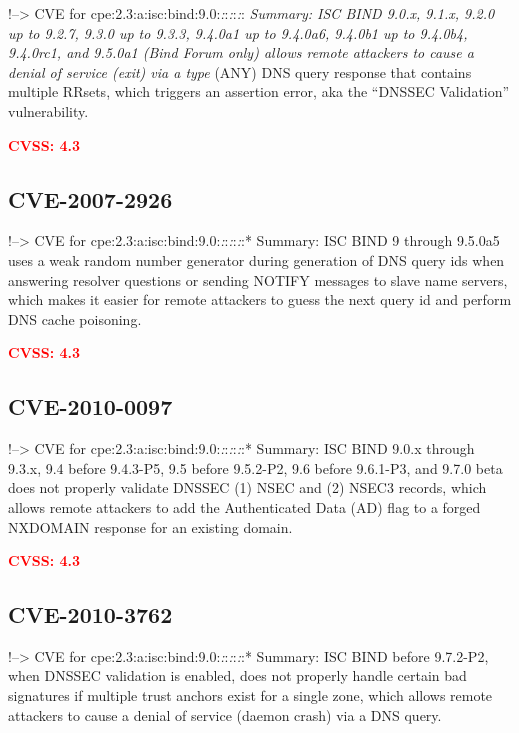 \documentclass[a4paper, 12pt]{article}
\begin{document}
!--\textgreater{} CVE for
cpe:2.3:a:isc:bind:9.0:\emph{:}:\emph{:}:\emph{:}:\emph{ Summary: ISC
BIND 9.0.x, 9.1.x, 9.2.0 up to 9.2.7, 9.3.0 up to 9.3.3, 9.4.0a1 up to
9.4.0a6, 9.4.0b1 up to 9.4.0b4, 9.4.0rc1, and 9.5.0a1 (Bind Forum only)
allows remote attackers to cause a denial of service (exit) via a type }
(ANY) DNS query response that contains multiple RRsets, which triggers
an assertion error, aka the ``DNSSEC Validation'' vulnerability.

\textbf{\textcolor{red}{CVSS: 4.3}}

\hypertarget{cve-2007-2926}{%
\subsection{CVE-2007-2926}\label{cve-2007-2926}}

!--\textgreater{} CVE for
cpe:2.3:a:isc:bind:9.0:\emph{:}:\emph{:}:\emph{:}:* Summary: ISC BIND 9
through 9.5.0a5 uses a weak random number generator during generation of
DNS query ids when answering resolver questions or sending NOTIFY
messages to slave name servers, which makes it easier for remote
attackers to guess the next query id and perform DNS cache poisoning.

\textbf{\textcolor{red}{CVSS: 4.3}}

\hypertarget{cve-2010-0097}{%
\subsection{CVE-2010-0097}\label{cve-2010-0097}}

!--\textgreater{} CVE for
cpe:2.3:a:isc:bind:9.0:\emph{:}:\emph{:}:\emph{:}:* Summary: ISC BIND
9.0.x through 9.3.x, 9.4 before 9.4.3-P5, 9.5 before 9.5.2-P2, 9.6
before 9.6.1-P3, and 9.7.0 beta does not properly validate DNSSEC (1)
NSEC and (2) NSEC3 records, which allows remote attackers to add the
Authenticated Data (AD) flag to a forged NXDOMAIN response for an
existing domain.

\textbf{\textcolor{red}{CVSS: 4.3}}

\hypertarget{cve-2010-3762}{%
\subsection{CVE-2010-3762}\label{cve-2010-3762}}

!--\textgreater{} CVE for
cpe:2.3:a:isc:bind:9.0:\emph{:}:\emph{:}:\emph{:}:* Summary: ISC BIND
before 9.7.2-P2, when DNSSEC validation is enabled, does not properly
handle certain bad signatures if multiple trust anchors exist for a
single zone, which allows remote attackers to cause a denial of service
(daemon crash) via a DNS query.
\end{document}
